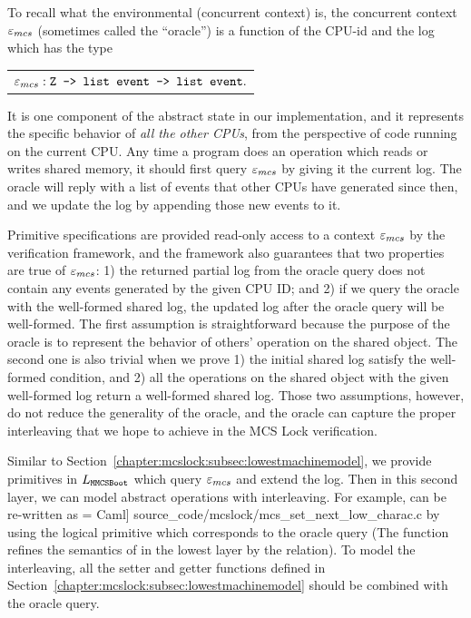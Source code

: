 To recall what the environmental (concurrent context) is,
the concurrent context ${\varepsilon}_{mcs}$ (sometimes called the ``oracle'') is
a function of the CPU-id and the log which has the type\newline
\begin{tabular}{P{0.95\textwidth}}
${\varepsilon}_{mcs}: {\mathrm{\texttt{Z -> list event -> list event}}}.$\\
\end{tabular}\newline
It is one component of the abstract state in our implementation, and it represents the specific behavior of \emph{all
the other CPUs}, from the perspective of code running on the current
CPU.  Any time a program does an operation which reads or writes
shared memory, it should first query ${\varepsilon}_{mcs}$ by giving it the
current log. The oracle will reply with a list of events that other
CPUs have generated since then, and we update the log by appending
those new events to it.

Primitive specifications are provided read-only access to a context
${\varepsilon}_{mcs}$ by the verification framework, and the framework also
guarantees that two properties are true of ${\varepsilon}_{mcs}$: 1) the returned
partial log from the oracle query does not contain any events
generated by the given CPU ID; and 2) if we query the oracle with the
well-formed shared log, the updated log after the oracle query will
be well-formed.
The first assumption is straightforward because the purpose of the oracle is to represent the behavior of others' operation on the shared object.
The second one is also trivial when we prove 1) the initial shared log satisfy the well-formed condition, and 2) all the operations on the shared object with the given well-formed log return a well-formed shared log.
Those two assumptions, however, do not reduce the generality of the oracle, and the oracle can capture the proper interleaving that we hope to achieve in the MCS Lock verification.

Similar to Section~\ref{chapter:mcslock:subsec:lowestmachinemodel}, 
we provide primitives in $L_{{\mathrm{\texttt{MMCSBoot}}}}$ which query ${\varepsilon}_{mcs}$ and extend the log.
Then in this second layer, we can model abstract operations with interleaving.
For example,  can be re-written as
 = Caml] {source_code/mcslock/mcs_set_next_low_charac.c}
by using the logical primitive which corresponds to the oracle query
(The function  refines the semantics of  in the lowest layer by the  relation).
To model the interleaving, all the setter and getter functions defined
in Section~\ref{chapter:mcslock:subsec:lowestmachinemodel} should be combined with the
oracle query.

